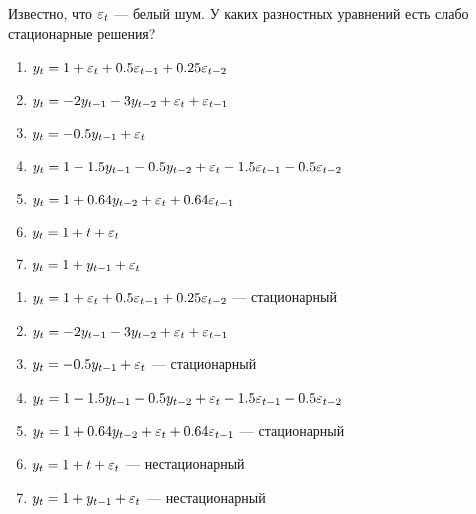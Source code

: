 \begin{problem}
Известно, что $\varepsilon_t$ — белый шум. У каких разностных уравнений есть слабо стационарные решения?
\begin{enumerate}
\item $y_t=1+\varepsilon_t+0.5\varepsilon_{t-1}+0.25\varepsilon_{t-2}$
\item $y_t=-2y_{t-1}-3y_{t-2}+\varepsilon_t+\varepsilon_{t-1}$
\item $y_t=-0.5y_{t-1} + \varepsilon_t$
\item $y_t=1-1.5 y_{t-1} - 0.5 y_{t-2} + \varepsilon_t - 1.5\varepsilon_{t-1} - 0.5\varepsilon_{t-2}$
\item $y_t=1+0.64y_{t-2}+\varepsilon_t+0.64\varepsilon_{t-1}$
\item $y_t=1+t+\varepsilon_t$
\item $y_t=1+y_{t-1}+\varepsilon_t$
\end{enumerate}
\begin{sol}

\begin{enumerate}
\item $y_t=1+\varepsilon_t+0.5\varepsilon_{t-1}+0.25\varepsilon_{t-2}$ — стационарный
\item $y_t=-2y_{t-1}-3y_{t-2}+\varepsilon_t+\varepsilon_{t-1}$
\item $y_t=-0.5y_{t-1} + \varepsilon_t$ — стационарный
\item $y_t=1-1.5 y_{t-1} - 0.5 y_{t-2} + \varepsilon_t - 1.5\varepsilon_{t-1} - 0.5\varepsilon_{t-2}$
\item $y_t=1+0.64y_{t-2}+\varepsilon_t+0.64\varepsilon_{t-1}$ — стационарный
\item $y_t=1+t+\varepsilon_t$ — нестационарный
\item $y_t=1+y_{t-1}+\varepsilon_t$ — нестационарный
\end{enumerate}
\end{sol}
\end{problem}







